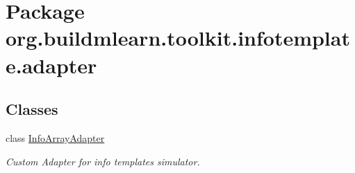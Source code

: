 \hypertarget{namespaceorg_1_1buildmlearn_1_1toolkit_1_1infotemplate_1_1adapter}{}\section{Package org.\+buildmlearn.\+toolkit.\+infotemplate.\+adapter}
\label{namespaceorg_1_1buildmlearn_1_1toolkit_1_1infotemplate_1_1adapter}
\subsection*{Classes}
\begin{DoxyCompactItemize}
\item 
class \hyperlink{classorg_1_1buildmlearn_1_1toolkit_1_1infotemplate_1_1adapter_1_1InfoArrayAdapter}{Info\+Array\+Adapter}
\begin{DoxyCompactList}\small\item\em Custom Adapter for info template\textquotesingle{}s simulator. \end{DoxyCompactList}\end{DoxyCompactItemize}
